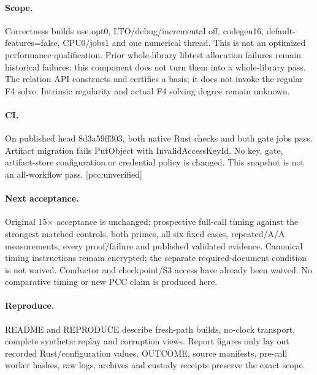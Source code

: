 \documentclass[10pt,a4paper]{article}
\begin{document}
\paragraph{Scope.} Correctness builds use opt0, LTO/debug/incremental off, codegen16, default-features=false, CPU0/jobs1 and one numerical thread. This is not an optimized performance qualification. Prior whole-library libtest allocation failures remain historical failures; this component does not turn them into a whole-library pass. The relation API constructs and certifies a basis; it does not invoke the regular F4 solve. Intrinsic regularity and actual F4 solving degree remain unknown.
\paragraph{CI.} On published head 8d3a59ff303, both native Rust checks and both gate jobs pass. Artifact migration fails PutObject with InvalidAccessKeyId. No key, gate, artifact-store configuration or credential policy is changed. This snapshot is not an all-workflow pass. [pcc:unverified]
\paragraph{Next acceptance.} Original 15$\times$ acceptance is unchanged: prospective full-call timing against the strongest matched controls, both primes, all six fixed cases, repeated/A/A measurements, every proof/failure and published validated evidence. Canonical timing instructions remain encrypted; the separate required-document condition is not waived. Conductor and checkpoint/S3 access have already been waived. No comparative timing or new PCC claim is produced here.
\paragraph{Reproduce.} README and REPRODUCE describe fresh-path builds, no-clock transport, complete synthetic replay and corruption views. Report figures only lay out recorded Rust/configuration values. OUTCOME, source manifests, pre-call worker hashes, raw logs, archives and custody receipts preserve the exact scope.
\end{document}
